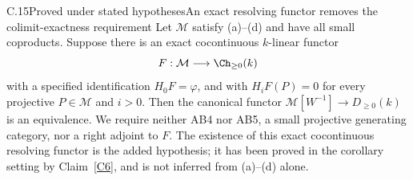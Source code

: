\begin{claim}{C.15}{Proved under stated hypotheses}{An exact resolving functor removes the colimit-exactness requirement}\label{C15}
Let $\mathcal M$ satisfy (a)--(d) and have all small coproducts. Suppose there is an exact cocontinuous $k$-linear functor
\[
 F:\mathcal M\longrightarrow\Ch_{\geq0}(k)
\]
with a specified identification $H_0F=\varphi$, and with $H_iF(P)=0$ for every projective $P\in\mathcal M$ and $i>0$. Then the canonical functor $\mathcal M[W^{-1}]\to D_{\geq0}(k)$ is an equivalence. We require neither AB4 nor AB5, a small projective generating category, nor a right adjoint to $F$. The existence of this exact cocontinuous resolving functor is the added hypothesis; it has been proved in the corollary setting by Claim~\ref{C6}, and is not inferred from (a)--(d) alone.
\end{claim}
